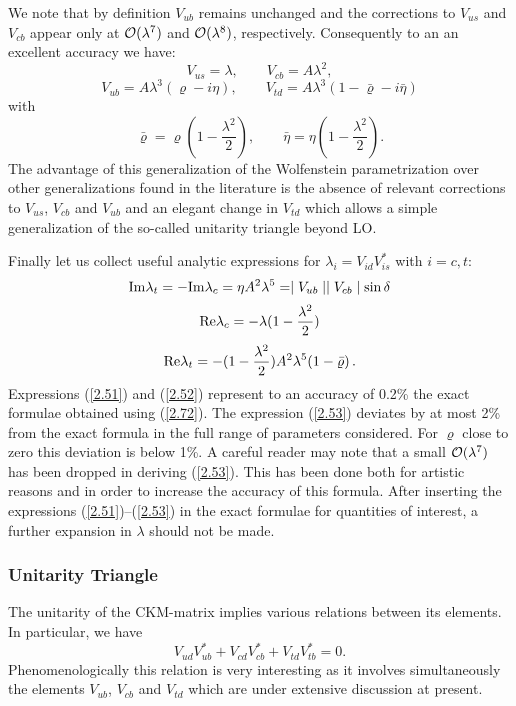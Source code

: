 \documentclass[12pt]{article}
\newcommand{\RE}{{\rm Re}}
\newcommand{\IM}{{\rm Im}}
\newcommand{\ord}{{\cal O}}
\begin{document}
\begin{itemize}
We note that by definition
$V_{ub}$ remains unchanged and the
corrections to $V_{us}$ and $V_{cb}$ appear only at $\ord(\lambda^7)$ and
$\ord(\lambda^8)$, respectively.
Consequently to an 
 an excellent accuracy we have:
\begin{equation}\label{CKM1}
V_{us}=\lambda, \qquad V_{cb}=A\lambda^2,
\end{equation}
\begin{equation}\label{CKM2}
V_{ub}=A\lambda^3(\varrho-i\eta),
\qquad
V_{td}=A\lambda^3(1-\bar\varrho-i\bar\eta)
\end{equation}
with
\begin{equation}\label{2.88d}
\bar\varrho=\varrho (1-\frac{\lambda^2}{2}),
\qquad
\bar\eta=\eta (1-\frac{\lambda^2}{2}).
\end{equation}
The advantage of this generalization of the Wolfenstein parametrization
over other generalizations found in the literature is the absence of
relevant corrections to $V_{us}$, $V_{cb}$ and $V_{ub}$ and an elegant
change in $V_{td}$ which allows a simple generalization of the 
so-called unitarity triangle beyond LO.

Finally let us collect useful analytic expressions
for $\lambda_i=V_{id}V^*_{is}$ with $i=c,t$:
\begin{equation}\label{2.51}
 \IM\lambda_t= -\IM\lambda_c=\eta A^2\lambda^5=
\mid V_{ub}\mid \mid V_{cb} \mid \sin\delta 
\end{equation}
\begin{equation}\label{2.52}
 \RE\lambda_c=-\lambda (1-\frac{\lambda^2}{2})
\end{equation}
\begin{equation}\label{2.53}
 \RE\lambda_t= -(1-\frac{\lambda^2}{2}) A^2\lambda^5 (1-\bar\varrho) \,.
\end{equation}
Expressions (\ref{2.51}) and (\ref{2.52}) represent to an accuracy of
0.2\% the exact formulae obtained using (\ref{2.72}). The expression
(\ref{2.53}) deviates by at most 2\% from the exact formula in the
full range of parameters considered. For $\varrho$ close to zero
this deviation is below 1\%. A careful reader may note that a small
$\ord(\lambda^7)$ has been dropped in deriving (\ref{2.53}). This
has been done both for artistic reasons and in order to increase
the accuracy of this formula.
After inserting the expressions (\ref{2.51})--(\ref{2.53}) in the exact
formulae for quantities of interest, a further expansion in $\lambda$
should not be made. 
\subsubsection{Unitarity Triangle}
The unitarity of the CKM-matrix implies various relations between its
elements. In particular, we have
\begin{equation}\label{2.87h}
V_{ud}^{}V_{ub}^* + V_{cd}^{}V_{cb}^* + V_{td}^{}V_{tb}^* =0.
\end{equation}
Phenomenologically this relation is very interesting as it involves
simultaneously the elements $V_{ub}$, $V_{cb}$ and $V_{td}$ which are
under extensive discussion at present.


\end{itemize}
\end{document}

